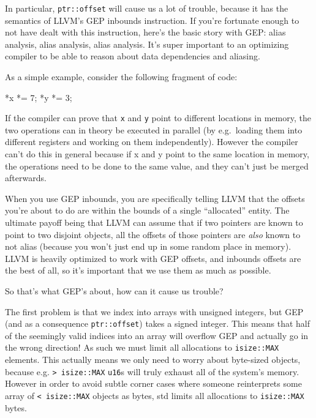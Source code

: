 \documentclass[a4paper,]{book}
\newenvironment{Shaded}{\begin{snugshade}}{\end{snugshade}}
\newcommand{\DecValTok}[1]{\textcolor[rgb]{0.00,0.00,0.81}{{#1}}}
\newcommand{\NormalTok}[1]{{#1}}
\begin{document}
In particular, \texttt{ptr::offset} will cause us a lot of trouble,
because it has the semantics of LLVM's GEP inbounds instruction. If
you're fortunate enough to not have dealt with this instruction, here's
the basic story with GEP: alias analysis, alias analysis, alias
analysis. It's super important to an optimizing compiler to be able to
reason about data dependencies and aliasing.

As a simple example, consider the following fragment of code:

\begin{Shaded}
\begin{Highlighting}[]
\NormalTok{*x *= }\DecValTok{7}\NormalTok{;}
\NormalTok{*y *= }\DecValTok{3}\NormalTok{;}
\end{Highlighting}
\end{Shaded}

If the compiler can prove that \texttt{x} and \texttt{y} point to
different locations in memory, the two operations can in theory be
executed in parallel (by e.g.~loading them into different registers and
working on them independently). However the compiler can't do this in
general because if x and y point to the same location in memory, the
operations need to be done to the same value, and they can't just be
merged afterwards.

When you use GEP inbounds, you are specifically telling LLVM that the
offsets you're about to do are within the bounds of a single
``allocated'' entity. The ultimate payoff being that LLVM can assume
that if two pointers are known to point to two disjoint objects, all the
offsets of those pointers are \emph{also} known to not alias (because
you won't just end up in some random place in memory). LLVM is heavily
optimized to work with GEP offsets, and inbounds offsets are the best of
all, so it's important that we use them as much as possible.

So that's what GEP's about, how can it cause us trouble?

The first problem is that we index into arrays with unsigned integers,
but GEP (and as a consequence \texttt{ptr::offset}) takes a signed
integer. This means that half of the seemingly valid indices into an
array will overflow GEP and actually go in the wrong direction! As such
we must limit all allocations to \texttt{isize::MAX} elements. This
actually means we only need to worry about byte-sized objects, because
e.g. \texttt{\textgreater{}\ isize::MAX} \texttt{u16}s will truly
exhaust all of the system's memory. However in order to avoid subtle
corner cases where someone reinterprets some array of
\texttt{\textless{}\ isize::MAX} objects as bytes, std limits all
allocations to \texttt{isize::MAX} bytes.
\end{document}
